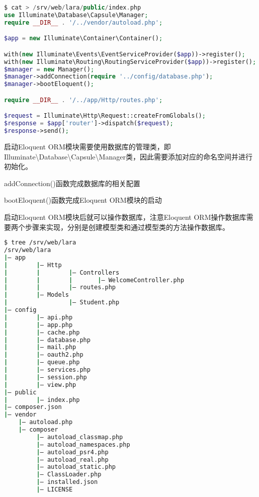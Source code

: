 \begin{lstlisting}[language=PHP]
$ cat > /srv/web/lara/public/index.php
use Illuminate\Database\Capsule\Manager;
require __DIR__ . '/../vendor/autoload.php';

$app = new Illuminate\Container\Container();

with(new Illuminate\Events\EventServiceProvider($app))->register();
with(new Illuminate\Routing\RoutingServiceProvider($app))->register();
$manager = new Manager();
$manager->addConnection(require '../config/database.php');
$manager->bootEloquent();

require __DIR__ . '/../app/Http/routes.php';

$request = Illuminate\Http\Request::createFromGlobals();
$response = $app['router']->dispatch($request);
$response->send();
\end{lstlisting}


启动Eloquent ORM模块需要使用数据库的管理类，即Illuminate\textbackslash Database\textbackslash Capsule\textbackslash Manager类，因此需要添加对应的命名空间并进行初始化。

\begin{compactitem}
\item addConnection()函数完成数据库的相关配置
\item bootEloquent()函数完成Eloquent ORM模块的启动
\end{compactitem}

启动Eloquent ORM模块后就可以操作数据库，注意Eloquent ORM操作数据库需要两个步骤来实现，分别是创建模型类和通过模型类的方法操作数据库。

\begin{lstlisting}[language=bash]
$ tree /srv/web/lara
/srv/web/lara
|— app
|        |— Http
|        |        |— Controllers
|        |        |       |— WelcomeController.php 
|        |        |— routes.php
|        |— Models
|                 |— Student.php
|— config
|        |— api.php
|        |— app.php
|        |— cache.php
|        |— database.php
|        |— mail.php
|        |— oauth2.php
|        |— queue.php
|        |— services.php
|        |— session.php
|        |— view.php
|— public
|        |— index.php
|— composer.json
|— vendor
    |— autoload.php
    |— composer
         |— autoload_classmap.php
         |— autoload_namespaces.php
         |— autoload_psr4.php
         |— autoload_real.php
         |— autoload_static.php
         |— ClassLoader.php
         |— installed.json
         |— LICENSE
\end{lstlisting}

